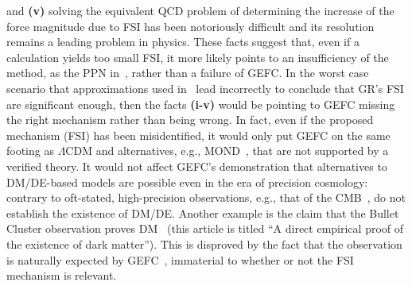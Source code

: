 \documentclass[superscriptaddress,amsmath,amssymb,nofootinbib]{revtex4}
\begin{document}
and \textbf{(v)} solving the equivalent QCD problem of determining the increase of the force magnitude due to FSI has been notoriously difficult 
and its resolution remains a leading problem in physics. 
These facts suggest that, even if a calculation yields too small FSI,
it more likely points to an insufficiency of the method, as the PPN in~\cite{Barker:2023xsx}, rather than a failure of GEFC. In the worst case scenario that approximations used in~\cite{Deur:2009ya, Deur:2016bwq, Deur:2017aas, Deur:2020wlg} %
lead incorrectly to conclude that GR's FSI are significant enough, 
then the facts \textbf{(i-v)} would be pointing to GEFC missing the right mechanism
rather than being wrong. In fact, even if the proposed mechanism (FSI) has been misidentified, it would only put GEFC on the same %
footing as $\Lambda$CDM and alternatives, e.g., MOND~\cite{Milgrom:1983ca}, that are not supported by a verified theory. 
%
It would not affect GEFC's demonstration that alternatives to DM/DE-based models 
are possible even in the era of precision cosmology: contrary to oft-stated,
high-precision observations, e.g., that of the CMB~\cite{Aghanim:2019ame}, do not establish the existence of DM/DE. Another example is the claim that the Bullet Cluster observation proves DM~\cite{Clowe:2006eq} (this article is titled ``A direct empirical proof of the existence of dark matter''). This is disproved by the fact that the observation is naturally expected by GEFC~\cite{Deur:2009ya}, immaterial to whether or not the FSI mechanism is relevant. 
\end{document}
